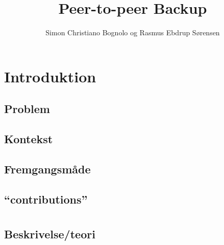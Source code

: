 

\usepackage{biblatex}




\title{Peer-to-peer Backup}
\author{Simon Christiano Bognolo og Rasmus Ebdrup Sørensen}



\frontmatter
\small
\tableofcontents
\normalsize
\newpage


\listoffixmes
 \newpage

%
\savepagenumber
\mainmatter
\linespread{1,5}
\selectfont
%

%

%

%
\newpage
%

%
\chapter{Introduktion}
  \section{Problem}
  \section{Kontekst}
  \section{Fremgangsmåde}
  \section{``contributions''}
\chapter{\des}
  \section{Beskrivelse/teori}
